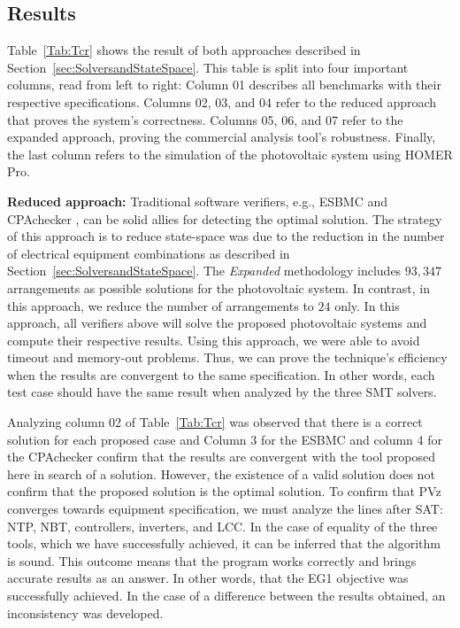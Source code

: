 \documentclass[review]{elsarticle}
\begin{document}
\subsection{Results}
\label{sec:results}

Table~\ref{Tab:Tcr} shows the result of both approaches described in Section~\ref{sec:SolversandStateSpace}. This table is split into four important columns, read from left to right: Column 01 describes all benchmarks with their respective specifications. Columns 02, 03, and 04 refer to the reduced approach that proves the system's correctness. Columns 05, 06, and 07 refer to the expanded approach, proving the commercial analysis tool's robustness. Finally, the last column refers to the simulation of the photovoltaic system using HOMER Pro.

\textbf{Reduced approach:} Traditional software verifiers, e.g., ESBMC \citep{esbmc2018} and CPAchecker \citep{Beyer2011}, can be solid allies for detecting the optimal solution. The strategy of this approach is to reduce state-space was due to the reduction in the number of electrical equipment combinations as described in Section~\ref{sec:SolversandStateSpace}. The \textit{Expanded} methodology includes $93,347$ arrangements as possible solutions for the photovoltaic system.
In contrast, in this approach, we reduce the number of arrangements to $24$ only. In this approach, all verifiers above will solve the proposed photovoltaic systems and compute their respective results. Using this approach, we were able to avoid timeout and memory-out problems. Thus, we can prove the technique's efficiency when the results are convergent to the same specification. In other words, each test case should have the same result when analyzed by the three SMT solvers.

Analyzing column 02 of Table~\ref{Tab:Tcr} was observed that there is a correct solution for each proposed case and Column 3 for the ESBMC and column 4 for the CPAchecker confirm that the results are convergent with the tool proposed here in search of a solution. However, the existence of a valid solution does not confirm that the proposed solution is the optimal solution. To confirm that PVz converges towards equipment specification, we must analyze the lines after SAT: NTP, NBT, controllers, inverters, and LCC. In the case of equality of the three tools, which we have successfully achieved, it can be inferred that the algorithm is sound. This outcome means that the program works correctly and brings accurate results as an answer. In other words, that the EG1 objective was successfully achieved. In the case of a difference between the results obtained, an inconsistency was developed.
\end{document}
